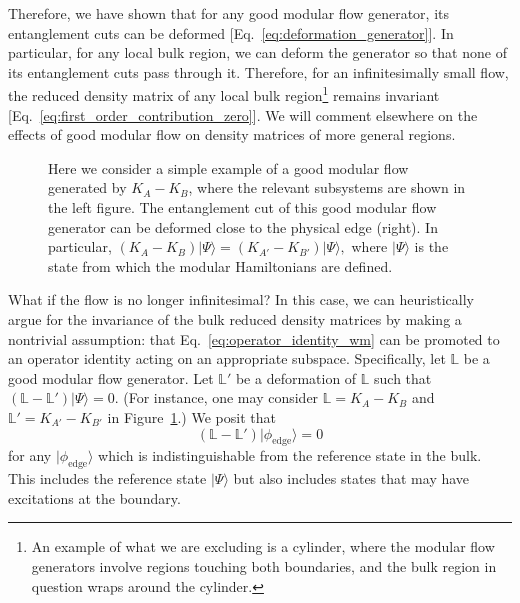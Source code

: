 \documentclass[12pt, nofootinbib]{article}
\theoremstyle{plain}
\theoremstyle{assumption}
\theoremstyle{definition}
\theoremstyle{plain}
\theoremstyle{plain}
\theoremstyle{plain}
\theoremstyle{plain}
\theoremstyle{plain}
\begin{document}
Therefore, we have shown that for any good modular flow generator, its entanglement cuts can be deformed [Eq.~\eqref{eq:deformation_generator}]. In particular, for any local bulk region, we can deform the generator so that none of its entanglement cuts pass through it. Therefore, for an infinitesimally small flow, the reduced density matrix of any local bulk region\footnote{An example of what we are excluding is a cylinder, 
where the modular flow generators involve regions touching both boundaries, and the bulk region in question wraps around the cylinder.} remains invariant [Eq.~\eqref{eq:first_order_contribution_zero}]. 
We will comment elsewhere on the effects of good modular flow on density matrices of more general regions.

\begin{figure}[h]
    \centering
    \caption{Here we consider a simple example of a good modular flow generated by $K_A - K_B$, where the relevant subsystems are shown in the left figure. The entanglement cut of this good modular flow generator can be deformed close to the physical edge (right). In particular, $(K_A - K_B)|\Psi\rangle = (K_{A'} - K_{B'})|\Psi\rangle,$ where $|\Psi\rangle$ is the state from which the modular Hamiltonians are defined.} 
    \label{fig:cut_deformation}
\end{figure}


What if the flow is no longer infinitesimal? In this case, we can heuristically argue for the invariance of the bulk reduced density matrices by making a nontrivial assumption: that Eq.~\eqref{eq:operator_identity_wm} can be promoted to an operator identity acting on an appropriate subspace. Specifically, let $\mathbb{L}$ be a good modular flow generator. Let $\mathbb{L}'$ be a deformation of $\mathbb{L}$ such that $(\mathbb{L} - \mathbb{L}')|\Psi\rangle=0$. (For instance, one may consider $\mathbb{L} = K_A - K_B$ and $\mathbb{L}' = K_{A'} - K_{B'} $ in Figure~\ref{fig:cut_deformation}.) We posit that
\begin{equation}
    (\mathbb{L} - \mathbb{L}')|\phi_{\text{edge}}\rangle = 0
    \label{eq:actual_op_identity_wm}
\end{equation}
for any $|\phi_{\text{edge}}\rangle$ which is indistinguishable from the reference state in the bulk. This includes the reference state $|\Psi\rangle$ but also includes states that may have excitations at the boundary.
\end{document}
